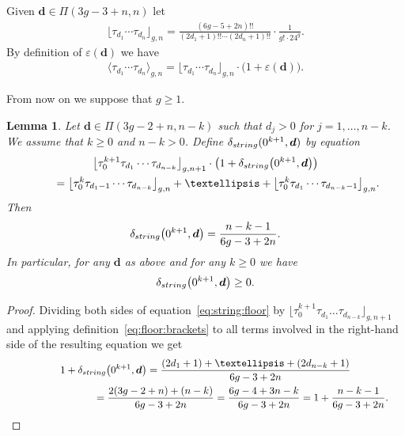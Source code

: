\documentclass[11pt]{article}
\renewcommand{\epsilon}{\varepsilon}
\newtheorem{Lemma}[Theorem]{Lemma}
\theoremstyle{definition}
\begin{document}
\setcounter{section}{2}
\setcounter{subsection}{0}
\setcounter{subsubsection}{0}
\setcounter{Theorem}{7}
\setcounter{equation}{10}
Given $\boldsymbol{d}\in\Pi(3g-3+n,n)$ let
\begin{gather}\label{eq:floor:brackets}
\lfloor \tau_{d_1} \cdots \tau_{d_n}\rfloor_{g,n}=
\frac{(6g-5+2n)!!}{(2d_1+1)!!\cdots(2d_n+1)!!}
\cdot\frac{1}{g!\cdot 24^g} .
\end{gather}
By definition of $\epsilon(\boldsymbol{d})$ we have
\begin{gather}\label{eq:def:of:epsilon}
\langle \tau_{d_1} \cdots \tau_{d_n}\rangle_{g,n}
=
\lfloor \tau_{d_1} \cdots \tau_{d_n}\rfloor_{g,n}
\cdot\big(1+\epsilon(\boldsymbol{d})\big) .
\end{gather}

From now on we suppose that $g\ge 1$.

\begin{Lemma}\label{lm:string}
Let $\boldsymbol{d}\in\Pi(3g-2+n,n-k)$ such that
$d_j>0$ for $j=1,\dots,n-k$. We assume that $k\ge 0$ and $n-k>0$.
Define $\delta_{\rm string}(0^{k+1},\boldsymbol{d})$
by equation
\begin{gather}
\big\lfloor \tau_0^{k+1}\tau_{d_1} \cdots \tau_{d_{n-k}}\big\rfloor_{g,n+1}
\cdot\big(1+\delta_{\rm string}\big(0^{k+1},\boldsymbol{d}\big)\big)
\nonumber\\
\qquad{} =
\big\lfloor \tau_0^k\tau_{d_1-1} \cdots \tau_{d_{n-k}}\big\rfloor_{g,n}
+\dots +\big\lfloor \tau_0^k\tau_{d_1} \cdots \tau_{d_{n-k}-1}\big\rfloor_{g,n} .\label{eq:string:floor}
\end{gather}
Then
\[
\delta_{\rm string}\big(0^{k+1},\boldsymbol{d}\big)=\frac{n-k-1}{6g-3+2n} .
\]
In particular, for any $\boldsymbol{d}$ as above and for any
$k\ge 0$ we have
\begin{gather}\label{eq:delta:string:is:positive}
\delta_{\rm string}\big(0^{k+1},\boldsymbol{d}\big)\ge 0 .
\end{gather}
\end{Lemma}

\begin{proof}Dividing both sides of equation~\eqref{eq:string:floor} by
$\big\lfloor \tau_0^{k+1}\tau_{d_1} \dots \tau_{d_{n-k}}\big\rfloor_{g,n+1}$
and applying definition~\eqref{eq:floor:brackets}
to all terms involved in the right-hand side of the resulting
equation we get
\begin{gather*}
1+\delta_{\rm string}\big(0^{k+1},\boldsymbol{d}\big)
=\frac{(2d_1+1)+\dots+(2d_{n-k}+1)}{6g-3+2n}
 \\
 \hphantom{1+\delta_{\rm string}\big(0^{k+1},\boldsymbol{d}\big)}{} =
\frac{2(3g-2+n)+(n-k)}{6g-3+2n}
=\frac{6g-4+3n-k}{6g-3+2n}
=1+\frac{n-k-1}{6g-3+2n} .\!\!\!\tag*{\qed}
\end{gather*}\renewcommand{\qed}{}
\end{proof}
\end{document}
